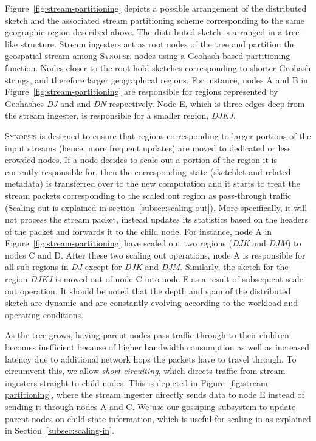 Figure~\ref{fig:stream-partitioning} depicts a possible arrangement of the distributed sketch and the associated stream partitioning scheme corresponding to the same geographic region described above.
The distributed sketch is arranged in a tree-like structure.
Stream ingesters act as root nodes of the tree and partition the geospatial stream among \textsc{Synopsis} nodes using a Geohash-based partitioning function.
Nodes closer to the root hold sketches corresponding to shorter Geohash strings, and therefore larger geographical regions.
For instance, nodes A and B in Figure~\ref{fig:stream-partitioning} are responsible for regions represented by Geohashes \emph{DJ} and and \emph{DN} respectively.
Node E, which is three edges deep from the stream ingester, is responsible for a smaller region, \emph{DJKJ}.

\textsc{Synopsis} is designed to ensure that regions corresponding to larger portions of the input streams (hence, more frequent updates) are moved to dedicated or less crowded nodes.
If a node decides to scale out a portion of the region it is currently responsible for, then the corresponding state (sketchlet and related metadata) is transferred over to the new computation and it starts to treat the stream packets corresponding to the scaled out region as pass-through traffic (Scaling out is explained in section~\ref{subsec:scaling-out}).
More specifically, it will not process the stream packet, instead updates its statistics based on the headers of the packet and forwards it to the child node. 
For instance, node A in Figure~\ref{fig:stream-partitioning} have scaled out two regions (\emph{DJK} and \emph{DJM}) to nodes C and D.
After these two scaling out operations, node A is responsible for all sub-regions in \emph{DJ} except for \emph{DJK} and \emph{DJM}.
Similarly, the sketch for the region \emph{DJKJ} is moved out of node C into node E as a result of subsequent scale out operation.
It should be noted that the depth and span of the distributed sketch are dynamic and are constantly evolving according to the workload and operating conditions.

As the tree grows, having parent nodes pass traffic through to their children becomes inefficient because of higher bandwidth consumption as well as increased latency due to additional network hops the packets have to travel through.
To circumvent this, we allow \emph{short circuiting}, which directs traffic from stream ingesters straight to child nodes.
This is depicted in Figure~\ref{fig:stream-partitioning}, where the stream ingester directly sends data to node E instead of sending it through nodes A and C.
We use our gossiping subsystem to update parent nodes on child state information, which is useful for scaling in as explained in Section~\ref{subsec:scaling-in}.

